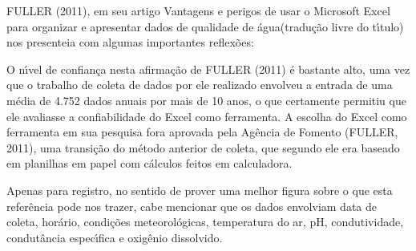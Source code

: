 \documentclass[
12pt,		%
openright,	%
twoside,  %
a4paper,			%
chapter=TITLE,		%
english,			%
french,				%
spanish,			%
brazil				%
]{USPSC-classe/USPSC}
\begin{document}
FULLER (2011), em seu artigo \textquotedbl Vantagens e perigos de usar o Microsoft Excel para organizar e apresentar dados de qualidade de \'agua\textquotedbl  (tradu\c{c}\~ao livre do t\'{\i}tulo) nos presenteia com algumas importantes reflex\~oes:


















\noindent\begin{center}\mbox{\centering{}}\end{center}


O n\'{\i}vel de confian\c{c}a nesta afirma\c{c}\~ao de  FULLER (2011) \'e bastante alto, uma vez que o trabalho de coleta de dados por ele realizado envolveu a entrada de uma m\'edia de 4.752 dados anuais por mais de 10 anos, o que certamente permitiu que ele avaliasse a confiabilidade do Excel como ferramenta. A escolha do Excel como ferramenta em sua pesquisa fora aprovada pela Ag\^encia de Fomento  (FULLER, 2011), uma transi\c{c}\~ao do m\'etodo anterior de coleta, que segundo ele era baseado em planilhas em papel com c\'alculos feitos em calculadora.

















Apenas para registro, no sentido de prover uma melhor figura sobre o que esta refer\^encia pode nos trazer, cabe mencionar que os dados envolviam data de coleta, hor\'ario, condi\c{c}\~oes meteorol\'ogicas, temperatura do ar, pH, condutividade, condut\^ancia espec\'{\i}fica e oxig\^enio dissolvido.
\end{document}
